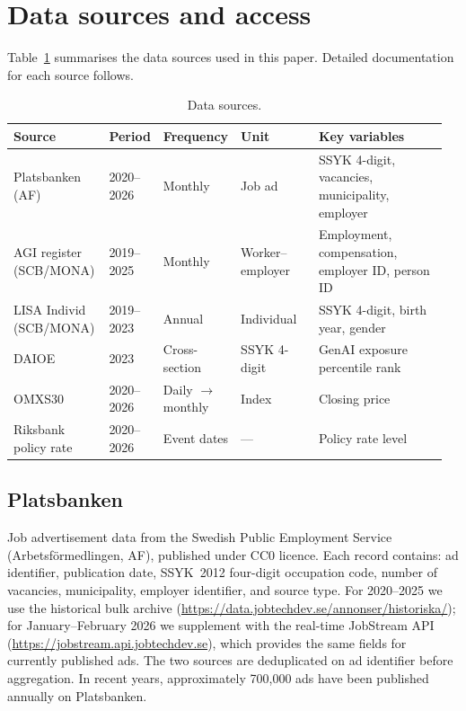\documentclass[preprint,12pt,authoryear]{elsarticle}
\begin{document}


\section{Data sources and access}

Table~\ref{tab:datasources} summarises the data sources used in this paper. Detailed documentation for each source follows.

\begin{table}[htbp]
\centering
\caption{Data sources.}
\label{tab:datasources}
\footnotesize
\begin{tabular}{@{}p{0.22\linewidth}p{0.11\linewidth}p{0.15\linewidth}p{0.18\linewidth}p{0.30\linewidth}@{}}
\toprule
Source & Period & Frequency & Unit & Key variables \\
\midrule
Platsbanken (AF) & 2020--2026 & Monthly & Job ad & SSYK 4-digit, vacancies, municipality, employer \\
AGI register (SCB/MONA) & 2019--2025 & Monthly & Worker--employer & Employment, compensation, employer ID, person ID \\
LISA Individ (SCB/MONA) & 2019--2023 & Annual & Individual & SSYK 4-digit, birth year, gender \\
DAIOE & 2023 & Cross-section & SSYK 4-digit & GenAI exposure percentile rank \\
OMXS30 & 2020--2026 & Daily $\to$ monthly & Index & Closing price \\
Riksbank policy rate & 2020--2026 & Event dates & --- & Policy rate level \\
\bottomrule
\end{tabular}
\end{table}

\subsection{Platsbanken}
Job advertisement data from the Swedish Public Employment Service (Arbetsf\"ormedlingen, AF), published under CC0 licence. Each record contains: ad identifier, publication date, SSYK~2012 four-digit occupation code, number of vacancies, municipality, employer identifier, and source type. For 2020--2025 we use the historical bulk archive (\url{https://data.jobtechdev.se/annonser/historiska/}); for January--February 2026 we supplement with the real-time JobStream API (\url{https://jobstream.api.jobtechdev.se}), which provides the same fields for currently published ads. The two sources are deduplicated on ad identifier before aggregation. In recent years, approximately 700,000 ads have been published annually on Platsbanken.
\end{document}
